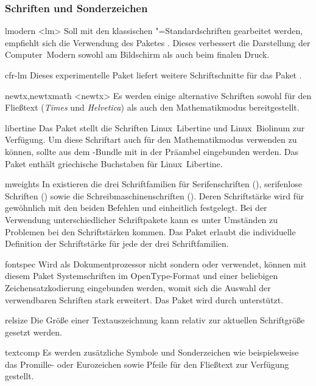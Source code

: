 \subsubsection{Schriften und Sonderzeichen}
\begin{packages}
\item[lmodern]<lm>%
  Soll mit den klassischen "=Standardschriften gearbeitet werden, 
  empfiehlt sich die Verwendung des Paketes . Dieses 
  verbessert die Darstellung der Computer~Modern sowohl am Bildschirm als auch 
  beim finalen Druck.
\item[cfr-lm]%
  Dieses experimentelle Paket liefert weitere Schriftschnitte für das Paket 
  .
\item[newtx,newtxmath]<newtx>%
  Es werden einige alternative Schriften sowohl für den Fließtext 
  (\textit{Times} und \textit{Helvetica}) als auch den Mathematikmodus 
  bereitgestellt.
\item[libertine]%
  Das Paket stellt die Schriften Linux~Libertine und Linux~Biolinum zur 
  Verfügung. Um diese Schriftart auch für den Mathematikmodus verwenden zu 
  können, sollte  aus dem -Bundle mit     
   in der 
  Präambel eingebunden werden. Das Paket  enthält griechische 
  Buchstaben für Linux~Libertine.
\item[mweights]%
  In  existieren die drei Schriftfamilien für Serifenschriften 
  (), serifenlose Schriften () sowie die 
  Schreibmaschinenschriften (). Deren Schriftstärke wird für 
  gewöhnlich mit den beiden Befehlen  und  
  einheitlich festgelegt. Bei der Verwendung unterschiedlicher Schriftpakete 
  kann es unter Umständen zu Problemen bei den Schriftstärken kommen. Das Paket 
   erlaubt die individuelle Definition der Schriftstärke für 
  jede der drei Schriftfamilien.
\item[fontspec]%
  Wird als Dokumentprozessor nicht  sondern  
  oder  verwendet, können mit diesem Paket Systemschriften im 
  OpenType-Format und einer beliebigen Zeichensatzkodierung eingebunden werden, 
  womit sich die Auswahl der verwendbaren Schriften stark erweitert. Das Paket 
  wird durch \TUDScript unterstützt.
\item[relsize]%
  Die Größe einer Textauszeichnung kann relativ zur aktuellen Schriftgröße 
  gesetzt werden.
\item[textcomp]%
  Es werden zusätzliche Symbole und Sonderzeichen wie beispielsweise das 
  Promille- oder Eurozeichen sowie Pfeile für den Fließtext zur Verfügung 
  gestellt.
\end{packages}
